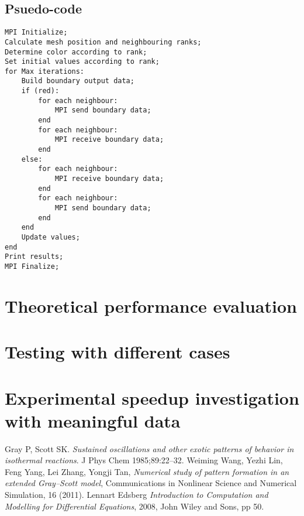\documentclass[a4paper,11pt]{article}
\begin{document}
\subsection*{Psuedo-code}
\begin{lstlisting}
MPI Initialize;
Calculate mesh position and neighbouring ranks;
Determine color according to rank;
Set initial values according to rank;
for Max iterations:
	Build boundary output data;
	if (red):
		for each neighbour:
			MPI send boundary data;
		end
		for each neighbour:
			MPI receive boundary data;
		end
	else:
		for each neighbour:
			MPI receive boundary data;
		end
		for each neighbour:
			MPI send boundary data;
		end
	end
	Update values;
end
Print results;
MPI Finalize;
\end{lstlisting}
\section*{Theoretical performance evaluation}
\section*{Testing with different cases}
\section*{Experimental speedup investigation with meaningful data}

\begin{thebibliography}{}
 Gray P, Scott SK. {\it Sustained oscillations and other exotic patterns of behavior in isothermal reactions}. J Phys Chem 1985;89:22–32.
 Weiming Wang, Yezhi Lin, Feng Yang, Lei Zhang, Yongji Tan, {\it Numerical study of pattern formation in an extended Gray–Scott model}, Communications in Nonlinear Science and Numerical Simulation, 16 (2011).
 Lennart Edsberg {\it Introduction to Computation and Modelling for Differential Equations}, 2008, John Wiley and Sons, pp 50.
\end{thebibliography}
\end{document}
